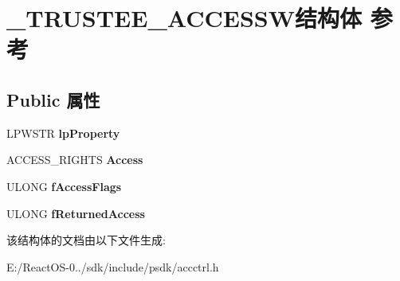 \hypertarget{struct___t_r_u_s_t_e_e___a_c_c_e_s_s_w}{}\section{\+\_\+\+T\+R\+U\+S\+T\+E\+E\+\_\+\+A\+C\+C\+E\+S\+S\+W结构体 参考}
\label{struct___t_r_u_s_t_e_e___a_c_c_e_s_s_w}
\subsection*{Public 属性}
\begin{DoxyCompactItemize}
\item 
\mbox{\label{struct___t_r_u_s_t_e_e___a_c_c_e_s_s_w_a35a5c845d4c4a89fcab34939ef0068b0}} 
L\+P\+W\+S\+TR {\bfseries lp\+Property}
\item 
\mbox{\label{struct___t_r_u_s_t_e_e___a_c_c_e_s_s_w_ac984d9cd11e89af4d9f323aa042c9f02}} 
A\+C\+C\+E\+S\+S\+\_\+\+R\+I\+G\+H\+TS {\bfseries Access}
\item 
\mbox{\label{struct___t_r_u_s_t_e_e___a_c_c_e_s_s_w_a003511cac010c8b97052887d0897a732}} 
U\+L\+O\+NG {\bfseries f\+Access\+Flags}
\item 
\mbox{\label{struct___t_r_u_s_t_e_e___a_c_c_e_s_s_w_a8e86bb87ded91514ef8247b5eda6064c}} 
U\+L\+O\+NG {\bfseries f\+Returned\+Access}
\end{DoxyCompactItemize}


该结构体的文档由以下文件生成\+:\begin{DoxyCompactItemize}
\item 
E\+:/\+React\+O\+S-\/0../sdk/include/psdk/accctrl.\+h\end{DoxyCompactItemize}
